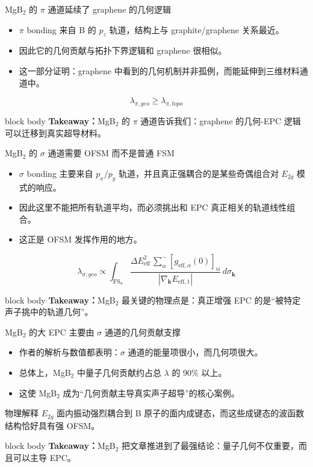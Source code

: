 \documentclass[aspectratio=169,11pt,UTF8]{ctexbeamer}
\newcommand{\takeaway}[1]{%
  \vfill
  \begin{beamercolorbox}[wd=\textwidth,sep=0.7ex,rounded=true]{block body}
    \small\textbf{Takeaway：}#1
  \end{beamercolorbox}
}
\begin{document}
\begin{frame}[fragile]{MgB$_2$ 的 $\pi$ 通道延续了 graphene 的几何逻辑}
  \begin{itemize}
    \item $\pi$ bonding 来自 B 的 $p_z$ 轨道，结构上与 graphite/graphene 关系最近。
    \item 因此它的几何贡献与拓扑下界逻辑和 graphene 很相似。
    \item 这一部分证明：graphene 中看到的几何机制并非孤例，而能延伸到三维材料通道中。
  \end{itemize}
  \begin{equation*}
    \lambda_{\pi,geo} \ge \lambda_{\pi,topo}
  \end{equation*}
  \takeaway{MgB$_2$ 的 $\pi$ 通道告诉我们：graphene 的几何-EPC 逻辑可以迁移到真实超导材料。}
\end{frame}

\begin{frame}[fragile]{MgB$_2$ 的 $\sigma$ 通道需要 OFSM 而不是普通 FSM}
  \begin{itemize}
    \item $\sigma$ bonding 主要来自 $p_x/p_y$ 轨道，并且真正强耦合的是某些奇偶组合对 $E_{2g}$ 模式的响应。
    \item 因此这里不能把所有轨道平均，而必须挑出和 EPC 真正相关的轨道线性组合。
    \item 这正是 OFSM 发挥作用的地方。
  \end{itemize}
  \begin{equation*}
    \lambda_{\sigma,geo}
    \propto
    \int_{\mathrm{FS}_{\sigma}}
    \frac{\Delta E_{\mathrm{eff}}^2 \,
    \sum_{\alpha}^{-} [g_{\mathrm{eff},\alpha}(0)]_{ii}}
    {|\nabla_{\mathbf{k}}E_{\mathrm{eff},1}|}
    \, d\sigma_{\mathbf{k}}
  \end{equation*}
  \takeaway{MgB$_2$ 最关键的物理点是：真正增强 EPC 的是“被特定声子挑中的轨道几何”。}
\end{frame}

\begin{frame}[fragile]{MgB$_2$ 的大 EPC 主要由 $\sigma$ 通道的几何贡献支撑}
  \begin{itemize}
    \item 作者的解析与数值都表明：$\sigma$ 通道的能量项很小，而几何项很大。
    \item 总体上，MgB$_2$ 中量子几何贡献约占总 $\lambda$ 的 90\% 以上。
    \item 这使 MgB$_2$ 成为“几何贡献主导真实声子超导”的核心案例。
  \end{itemize}
  \begin{block}{物理解释}
    $E_{2g}$ 面内振动强烈耦合到 B 原子的面内成键态，而这些成键态的波函数结构恰好具有强 OFSM。
  \end{block}
  \takeaway{MgB$_2$ 把文章推进到了最强结论：量子几何不仅重要，而且可以主导 EPC。}
\end{frame}
\end{document}
